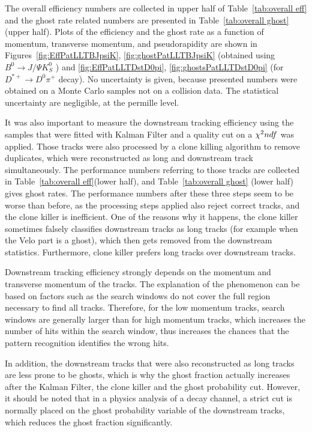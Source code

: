 The overall efficiency numbers are collected in upper half of Table~\ref{tab:overall eff} and the ghost rate related numbers are presented in Table~\ref{tab:overall ghost} (upper half). Plots of the efficiency and the ghost rate as a function of momentum, transverse momentum, and pseudorapidity are shown in 
Figures~\ref{fig:EffPatLLTBJpsiK}, \ref{fig:ghostPatLLTBJpsiK}  (obtained using  $B^{0} \rightarrow J/\Psi K^{0}_{S}$ ) and \ref{fig:EffPatLLTDstD0pi}, \ref{fig:ghostsPatLLTDstD0pi} (for $D^{*+} \rightarrow D^{0}\pi^+$ decay). No uncertainty is given, because presented numbers were obtained on a Monte Carlo samples not on a collision data. The statistical uncertainty are negligible, at the permille level.  

It was also important to measure the downstream tracking efficiency using the samples that were fitted with Kalman Filter and a quality cut on a $\chi^2\/ndf$ was applied. Those tracks were also processed by a clone killing algorithm to remove duplicates, which were reconstructed as long and downstream track simultaneously. The performance numbers referring to those tracks are collected in Table~\ref{tab:overall eff}(lower half), and Table~\ref{tab:overall ghost} (lower half) gives ghost rates. The performance numbers after these three steps seem to be worse than before, as the processing steps applied also reject correct tracks, and the clone killer is inefficient. One of the reasons why it happens, the clone killer sometimes falsely classifies downstream tracks as long tracks (for example when the Velo part is a ghost), which then gets removed from the downstream statistics. Furthermore, clone killer prefers long tracks over downstream tracks. 

Downstream tracking efficiency strongly depends on the momentum and transverse momentum of the tracks. The explanation of the phenomenon can be based on factors such as the search windows do not cover the full region necessary to find all tracks. Therefore, for the low momentum tracks, search windows are generally larger than for high momentum tracks, which increases the number of hits within the search window, thus increases the chances that the pattern recognition identifies the wrong hits.

In addition, the downstream tracks that were also reconstructed as long tracks
are less prone to be ghosts, which is why the ghost fraction actually increases
after the Kalman Filter, the clone killer and the ghost probability cut. However, it should be noted that
in a physics analysis of a decay channel, a strict cut is normally placed on the ghost probability variable of the downstream tracks, which reduces the ghost fraction
significantly.


